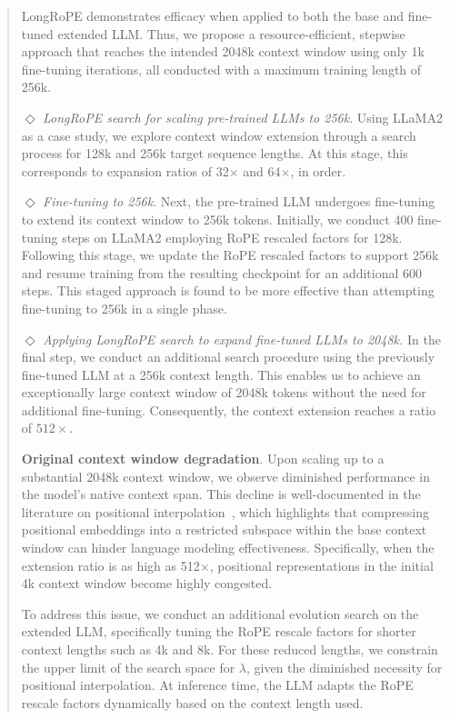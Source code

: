 \begin{abstract}
LongRoPE demonstrates efficacy when applied to both the base and fine-tuned extended LLM. Thus, we propose a resource-efficient, stepwise approach that reaches the intended 2048k context window using only 1k fine-tuning iterations, all conducted with a maximum training length of 256k.

$\Diamond$ \textit{LongRoPE search for scaling pre-trained LLMs to 256k}. Using LLaMA2 as a case study, we explore context window extension through a search process for 128k and 256k target sequence lengths. At this stage, this corresponds to expansion ratios of 32$\times$ and 64$\times$, in order.

$\Diamond$ \textit{Fine-tuning to 256k}. Next, the pre-trained LLM undergoes fine-tuning to extend its context window to 256k tokens. Initially, we conduct 400 fine-tuning steps on LLaMA2 employing RoPE rescaled factors for 128k. Following this stage, we update the RoPE rescaled factors to support 256k and resume training from the resulting checkpoint for an additional 600 steps. This staged approach is found to be more effective than attempting fine-tuning to 256k in a single phase.

$\Diamond$ \textit{Applying LongRoPE search to expand fine-tuned LLMs to 2048k.} In the final step, we conduct an additional search procedure using the previously fine-tuned LLM at a 256k context length. This enables us to achieve an exceptionally large context window of 2048k tokens without the need for additional fine-tuning. Consequently, the context extension reaches a ratio of $512\times$.

\textbf{Original context window degradation}. Upon scaling up to a substantial 2048k context window, we observe diminished performance in the model's native context span. This decline is well-documented in the literature on positional interpolation~\cite{pi}, which highlights that compressing positional embeddings into a restricted subspace within the base context window can hinder language modeling effectiveness. Specifically, when the extension ratio is as high as 512$\times$, positional representations in the initial 4k context window become highly congested.

To address this issue, we conduct an additional evolution search on the extended LLM, specifically tuning the RoPE rescale factors for shorter context lengths such as 4k and 8k. For these reduced lengths, we constrain the upper limit of the search space for $\lambda$, given the diminished necessity for positional interpolation. At inference time, the LLM adapts the RoPE rescale factors dynamically based on the context length used.


\end{abstract}
